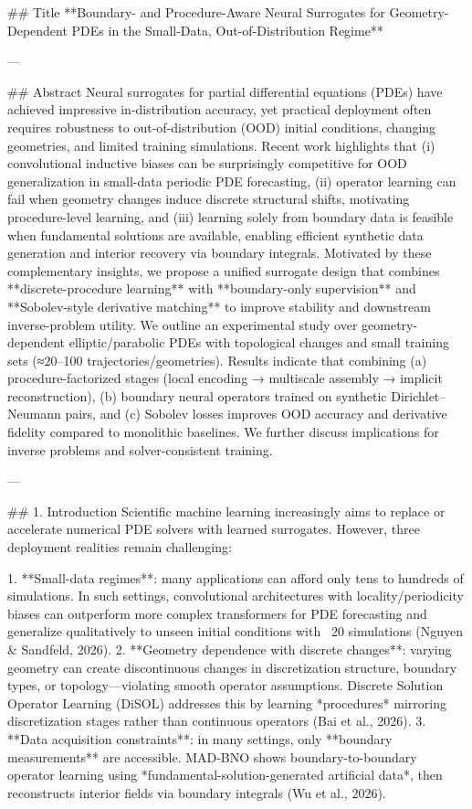 ## Title
**Boundary- and Procedure-Aware Neural Surrogates for Geometry-Dependent PDEs in the Small-Data, Out-of-Distribution Regime**

---

## Abstract
Neural surrogates for partial differential equations (PDEs) have achieved impressive in-distribution accuracy, yet practical deployment often requires robustness to out-of-distribution (OOD) initial conditions, changing geometries, and limited training simulations. Recent work highlights that (i) convolutional inductive biases can be surprisingly competitive for OOD generalization in small-data periodic PDE forecasting, (ii) operator learning can fail when geometry changes induce discrete structural shifts, motivating procedure-level learning, and (iii) learning solely from boundary data is feasible when fundamental solutions are available, enabling efficient synthetic data generation and interior recovery via boundary integrals. Motivated by these complementary insights, we propose a unified surrogate design that combines **discrete-procedure learning** with **boundary-only supervision** and **Sobolev-style derivative matching** to improve stability and downstream inverse-problem utility. We outline an experimental study over geometry-dependent elliptic/parabolic PDEs with topological changes and small training sets (≈20–100 trajectories/geometries). Results indicate that combining (a) procedure-factorized stages (local encoding → multiscale assembly → implicit reconstruction), (b) boundary neural operators trained on synthetic Dirichlet–Neumann pairs, and (c) Sobolev losses improves OOD accuracy and derivative fidelity compared to monolithic baselines. We further discuss implications for inverse problems and solver-consistent training.

---

## 1. Introduction
Scientific machine learning increasingly aims to replace or accelerate numerical PDE solvers with learned surrogates. However, three deployment realities remain challenging:

1. **Small-data regimes**: many applications can afford only tens to hundreds of simulations. In such settings, convolutional architectures with locality/periodicity biases can outperform more complex transformers for PDE forecasting and generalize qualitatively to unseen initial conditions with ~20 simulations (Nguyen & Sandfeld, 2026).
2. **Geometry dependence with discrete changes**: varying geometry can create discontinuous changes in discretization structure, boundary types, or topology—violating smooth operator assumptions. Discrete Solution Operator Learning (DiSOL) addresses this by learning *procedures* mirroring discretization stages rather than continuous operators (Bai et al., 2026).
3. **Data acquisition constraints**: in many settings, only **boundary measurements** are accessible. MAD-BNO shows boundary-to-boundary operator learning using *fundamental-solution-generated artificial data*, then reconstructs interior fields via boundary integrals (Wu et al., 2026).

